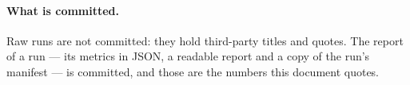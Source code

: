\paragraph{What is committed.} Raw runs are not committed: they hold
third-party titles and quotes. The report of a run --- its metrics in
JSON, a readable report and a copy of the run's manifest --- is
committed, and those are the numbers this document quotes.
